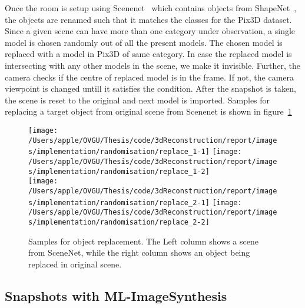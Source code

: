 Once the room is setup using Scenenet~\cite{McCormac:etal:ICCV2017} which contains objects from ShapeNet~\cite{chang2015shapenet}, the objects are renamed such that it matches the classes for the Pix3D dataset.
Since a given scene can have more than one category under observation, a single model is chosen randomly out of all the present models.
The chosen model is replaced with a model in Pix3D of same category.
In case the replaced model is intersecting with any other models in the scene, we make it invisible.
Further, the camera checks if the centre of replaced model is in the frame.
If not, the camera viewpoint is changed untill it satisfies the condition.
After the snapshot is taken, the scene is reset to the original and next model is imported.
Samples for replacing a target object from original scene from Scenenet is shown in figure~\ref{fig:replace model}

\begin{figure}
    \centering
        \texttt{[image: /Users/apple/OVGU/Thesis/code/3dReconstruction/report/images/implementation/randomisation/replace\_1-1]}
        \texttt{[image: /Users/apple/OVGU/Thesis/code/3dReconstruction/report/images/implementation/randomisation/replace\_1-2]} \\
        \vspace{0.1cm}
        \texttt{[image: /Users/apple/OVGU/Thesis/code/3dReconstruction/report/images/implementation/randomisation/replace\_2-1]}
        \texttt{[image: /Users/apple/OVGU/Thesis/code/3dReconstruction/report/images/implementation/randomisation/replace\_2-2]}\\
    \caption{Samples for object replacement. The Left column shows a scene from SceneNet, while the right column shows an object being replaced in original scene.}
    \label{fig:replace model}
\end{figure}

\subsection{Snapshots with ML-ImageSynthesis}\label{subsec:snapshots-with-ml-imagesynthesis}

